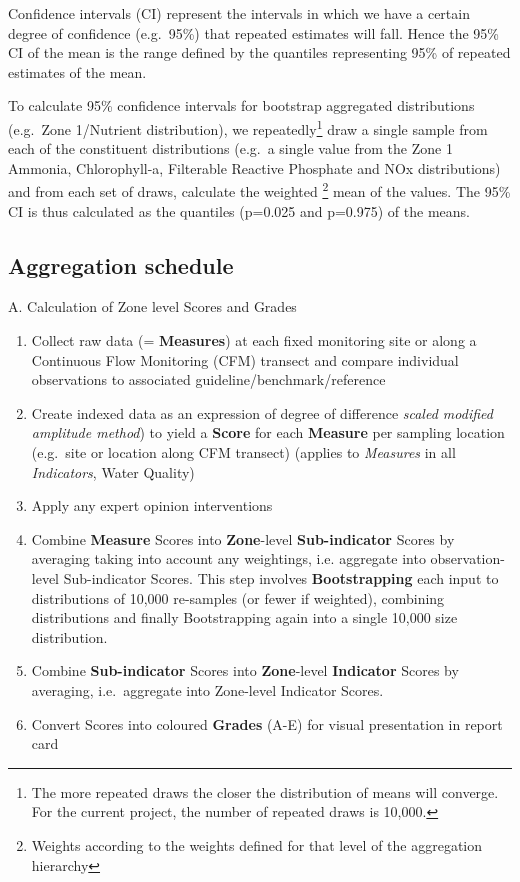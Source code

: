 \documentclass[
  8pt,
  a4paper]{article}
\begin{document}
Confidence intervals (CI) represent the intervals in which we have a
certain degree of confidence (e.g.~95\%) that repeated estimates will
fall. Hence the 95\% CI of the mean is the range defined by the
quantiles representing 95\% of repeated estimates of the mean.

To calculate 95\% confidence intervals for bootstrap aggregated
distributions (e.g.~Zone 1/Nutrient distribution), we
repeatedly\footnote{The more repeated draws the closer the
distribution of means will converge. For the current project, the
number of repeated draws is 10,000.} draw a single sample from each of
the constituent distributions (e.g.~a single value from the Zone 1
Ammonia, Chlorophyll-a, Filterable Reactive Phosphate and NOx
distributions) and from each set of draws, calculate the weighted
\footnote{Weights according to the weights defined for that level of
the aggregation hierarchy} mean of the values. The 95\% CI is thus
calculated as the quantiles (p=0.025 and p=0.975) of the means.

\subsection{Aggregation schedule}\label{aggregation-schedule}

A. Calculation of Zone level Scores and Grades

\begin{enumerate}
\def\labelenumi{\arabic{enumi}.}
\item
  Collect raw data (= \textbf{Measures}) at each fixed monitoring site
  or along a Continuous Flow Monitoring (CFM) transect and compare
  individual observations to associated guideline/benchmark/reference
\item
  Create indexed data as an expression of degree of difference
  \emph{scaled modified amplitude method}) to yield a \textbf{Score} for
  each \textbf{Measure} per sampling location (e.g.~site or location
  along CFM transect) (applies to \emph{Measures} in all
  \emph{Indicators}, Water Quality)
\item
  Apply any expert opinion interventions
\item
  Combine \textbf{Measure} Scores into \textbf{Zone}-level
  \textbf{Sub-indicator} Scores by averaging taking into account any
  weightings, i.e. aggregate into observation-level Sub-indicator
  Scores. This step involves \textbf{Bootstrapping} each input to
  distributions of 10,000 re-samples (or fewer if weighted), combining
  distributions and finally Bootstrapping again into a single 10,000
  size distribution.
\item
  Combine \textbf{Sub-indicator} Scores into \textbf{Zone}-level
  \textbf{Indicator} Scores by averaging, i.e.~aggregate into Zone-level
  Indicator Scores.
\item
  Convert Scores into coloured \textbf{Grades} (A-E) for visual
  presentation in report card
\end{enumerate}
\end{document}
